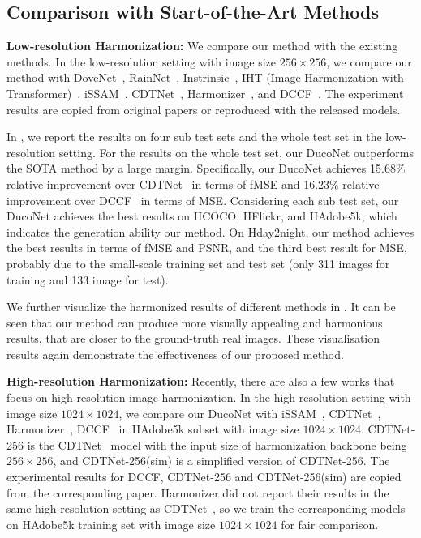 \documentclass[sigconf]{acmart}
\begin{document}
\subsection{Comparison with Start-of-the-Art Methods}
\noindent\textbf{Low-resolution Harmonization: } We compare our method with the existing methods. 
In the low-resolution setting with image size $256 \times 256$, we compare our method with DoveNet~\cite{dovenet}, RainNet~\cite{rainnet}, Instrinsic~\cite{intrinsic}, IHT (Image Harmonization with Transformer)~\cite{IHT}, iSSAM~\cite{issam}, CDTNet~\cite{CDTNet}, Harmonizer~\cite{harmonizer}, and DCCF~\cite{DCCF}. The experiment results are copied from original papers or reproduced with the released models.

In , we report the results on four sub test sets and the whole test set in the low-resolution setting.
For the results on the whole test set, our DucoNet outperforms the SOTA method by a large margin.
Specifically, our DucoNet achieves 15.68\% relative improvement over CDTNet~\cite{CDTNet} in terms of fMSE and 16.23\% relative improvement over DCCF~\cite{DCCF} in terms of MSE. 
Considering each sub test set, our DucoNet achieves the best results on HCOCO, HFlickr, and HAdobe5k, which indicates the generation ability our method.
On Hday2night, our method achieves the best results in terms of fMSE and PSNR, and the third best result for MSE, probably due to the small-scale training set and test set (only 311 images for training and 133 image for test). 

We further visualize the harmonized results of different methods in .
It can be seen that our method can produce more visually appealing and harmonious results, that are closer to the ground-truth real images. These visualisation results again demonstrate the effectiveness of our proposed method. 

\noindent\textbf{High-resolution Harmonization: } 
Recently, there are also a few works that focus on high-resolution image harmonization.
In the high-resolution setting with image size $1024 \times 1024$, we compare our  DucoNet with iSSAM~\cite{issam}, CDTNet~\cite{CDTNet}, Harmonizer~\cite{harmonizer}, DCCF~\cite{DCCF} in HAdobe5k subset with image size $1024 \times 1024$. 
CDTNet-256 is the CDTNet~\cite{CDTNet} model with the input size of harmonization backbone being $256\times 256$, and CDTNet-256(sim) is a simplified version of CDTNet-256. 
The experimental results for DCCF, CDTNet-256 and CDTNet-256(sim) are copied from the corresponding paper. 
Harmonizer did not report their results in the same high-resolution setting as CDTNet~\cite{CDTNet}, so we train the corresponding models on HAdobe5k training set with image size $1024 \times 1024$ for fair comparison. 
\end{document}
